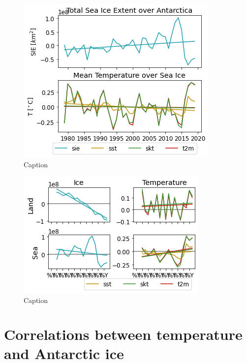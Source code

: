 \documentclass[../main.tex]{subfiles}
\begin{document}
\begin{figure}[H]
    \centering
    \includegraphics{images/week8/lres/seaice_temperature_timeseries}
    \caption{Caption}
    \label{fig:my_label}
\end{figure}

\begin{figure}[H]
    \centering
    \includegraphics{images/week8/lres/six_timeseries}
    \caption{Caption}
    \label{fig:my_label}
\end{figure}

\section{Correlations between temperature and Antarctic ice}
\label{sec:correlations_temp_ice}
\end{document}

